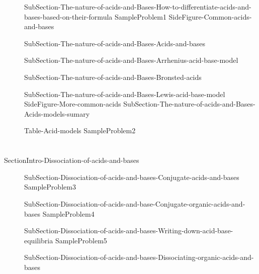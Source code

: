\documentclass[main.tex]{subfiles}
\begin{document}
\sloppy
\begin{description}
\item[] {SubSection-The-nature-of-acids-and-Bases-How-to-differentiate-acids-and-bases-based-on-their-formula}
  {SampleProblem1}
 {SideFigure-Common-acids-and-bases}
\item[] {SubSection-The-nature-of-acids-and-Bases-Acids-and-bases}
\item[] {SubSection-The-nature-of-acids-and-Bases-Arrhenius-acid-base-model}
\item[]{SubSection-The-nature-of-acids-and-Bases-Bronsted-acids}
\item[]{SubSection-The-nature-of-acids-and-Bases-Lewis-acid-base-model}
 {SideFigure-More-common-acids}
{SubSection-The-nature-of-acids-and-Bases-Acids-models-sumary}
 
 
  {Table-Acid-models}
  {SampleProblem2}
\end{description}
\section{\color{blue!30!black}{Dissociation of acids and bases}}{SectionIntro-Dissociation-of-acids-and-bases}
\sloppy\begin{description}
\item[] {SubSection-Dissociation-of-acids-and-bases-Conjugate-acids-and-bases}
  {SampleProblem3}
\item[] {SubSection-Dissociation-of-acids-and-base-Conjugate-organic-acids-and-bases}
  {SampleProblem4}
\item[] {SubSection-Dissociation-of-acids-and-bases-Writing-down-acid-base-equilibria}
  {SampleProblem5}
 \item[] {SubSection-Dissociation-of-acids-and-bases-Dissociating-organic-acids-and-bases}
 
\end{description}
\end{document}
